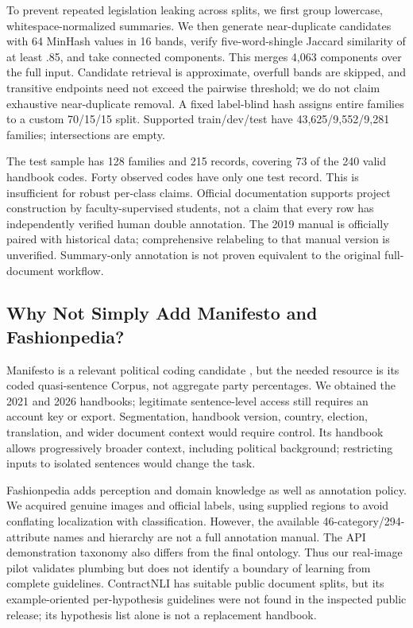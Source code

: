 \documentclass[11pt]{article}
\begin{document}
To prevent repeated legislation leaking across splits, we first group lowercase, whitespace-normalized summaries. We then generate near-duplicate candidates with 64 MinHash values in 16 bands, verify five-word-shingle Jaccard similarity of at least .85, and take connected components. This merges 4,063 components over the full input. Candidate retrieval is approximate, overfull bands are skipped, and transitive endpoints need not exceed the pairwise threshold; we do not claim exhaustive near-duplicate removal. A fixed label-blind hash assigns entire families to a custom 70/15/15 split. Supported train/dev/test have 43,625/9,552/9,281 families; intersections are empty.

The test sample has 128 families and 215 records, covering 73 of the 240 valid handbook codes. Forty observed codes have only one test record. This is insufficient for robust per-class claims. Official documentation supports project construction by faculty-supervised students, not a claim that every row has independently verified human double annotation. The 2019 manual is officially paired with historical data; comprehensive relabeling to that manual version is unverified. Summary-only annotation is not proven equivalent to the original full-document workflow.

\subsection{Why Not Simply Add Manifesto and Fashionpedia?}
Manifesto is a relevant political coding candidate \citep{manifesto}, but the needed resource is its coded quasi-sentence Corpus, not aggregate party percentages. We obtained the 2021 and 2026 handbooks; legitimate sentence-level access still requires an account key or export. Segmentation, handbook version, country, election, translation, and wider document context would require control. Its handbook allows progressively broader context, including political background; restricting inputs to isolated sentences would change the task.

Fashionpedia \citep{fashionpedia} adds perception and domain knowledge as well as annotation policy. We acquired genuine images and official labels, using supplied regions to avoid conflating localization with classification. However, the available 46-category/294-attribute names and hierarchy are not a full annotation manual. The API demonstration taxonomy also differs from the final ontology. Thus our real-image pilot validates plumbing but does not identify a boundary of learning from complete guidelines. ContractNLI has suitable public document splits, but its example-oriented per-hypothesis guidelines were not found in the inspected public release; its hypothesis list alone is not a replacement handbook.
\end{document}
